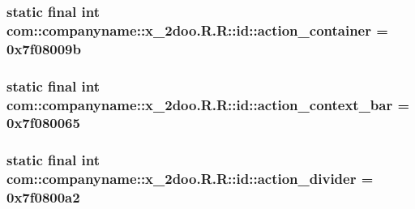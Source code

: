 \hypertarget{classcom_1_1companyname_1_1x__2doo_1_1_r_1_1id_d61d8f1cedaafb8a2673d18f613cb826}{
\subsubsection[{action\_\-container}]{\setlength{\rightskip}{0pt plus 5cm}static final int com::companyname::x\_\-2doo.R.R::id::action\_\-container = 0x7f08009b}}
\label{classcom_1_1companyname_1_1x__2doo_1_1_r_1_1id_d61d8f1cedaafb8a2673d18f613cb826}


\hypertarget{classcom_1_1companyname_1_1x__2doo_1_1_r_1_1id_54174200cee8c3b4d0e3dc43e9139cec}{
\subsubsection[{action\_\-context\_\-bar}]{\setlength{\rightskip}{0pt plus 5cm}static final int com::companyname::x\_\-2doo.R.R::id::action\_\-context\_\-bar = 0x7f080065}}
\label{classcom_1_1companyname_1_1x__2doo_1_1_r_1_1id_54174200cee8c3b4d0e3dc43e9139cec}


\hypertarget{classcom_1_1companyname_1_1x__2doo_1_1_r_1_1id_61deca298ab1edeafdd289cca735a1e2}{
\subsubsection[{action\_\-divider}]{\setlength{\rightskip}{0pt plus 5cm}static final int com::companyname::x\_\-2doo.R.R::id::action\_\-divider = 0x7f0800a2}}
\label{classcom_1_1companyname_1_1x__2doo_1_1_r_1_1id_61deca298ab1edeafdd289cca735a1e2}


